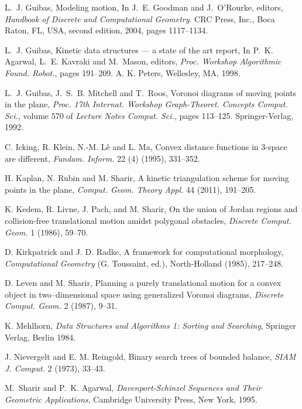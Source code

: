 \documentclass[letter,11pt]{article}
\begin{document}
\begin{thebibliography}{10}
L.~J. Guibas,
Modeling motion,
In J.~E. Goodman and J.~O'Rourke, editors, {\em Handbook of Discrete
and Computational Geometry}. CRC Press, Inc., Boca Raton, FL, USA, second
edition, 2004, pages 1117--1134.

L.~J. Guibas,
Kinetic data structures --- a state of the art report,
In P.~K. Agarwal, L.~E. Kavraki and M.~Mason, editors, {\em Proc.
Workshop Algorithmic Found. Robot.}, pages 191--209. A. K. Peters, Wellesley,
MA, 1998.

L.~J. Guibas, J.~S.~B. Mitchell and T.~Roos,
Voronoi diagrams of moving points in the plane,
{\em Proc. 17th Internat. Workshop Graph-Theoret. Concepts Comput.
Sci.}, volume 570 of {\em Lecture Notes Comput. Sci.}, pages 113--125.
Springer-Verlag, 1992.

C. Icking, R. Klein, N.-M. L\^{e} and L. Ma,
Convex distance functions in 3-space are different, {\it Fundam. Inform.} 22 (4) (1995), 331--352.

H. Kaplan, N. Rubin and M. Sharir, 
A kinetic triangulation scheme for moving points in the plane, {\it Comput. Geom. Theory Appl.} 44 (2011), 191--205.

K. Kedem, R. Livne, J. Pach, and M. Sharir, On the union of Jordan regions and collision-free translational motion amidst polygonal obstacles, {\em Discrete Comput. Geom.} 1 (1986), 59--70.

D. Kirkpatrick and J. D. Radke, A framework for computational morphology, \textit{Computational Geometry} (G. Toussaint, ed.), North-Holland (1985), 217--248.

D. Leven and M. Sharir,
Planning a purely translational motion for a convex object in
two--dimensional space using generalized Voronoi diagrams,
{\it Discrete Comput. Geom.} 2 (1987), 9--31.

K. Mehlhorn, \textit{Data Structures and Algorithms 1: Sorting and Searching}, Springer Verlag, Berlin 1984.

J. Nievergelt and E. M. Reingold, Binary search trees of bounded balance, {\it SIAM J. Comput.} 2 (1973),
33--43.

M.~Sharir and P.~K. Agarwal,
{\em Davenport-Schinzel Sequences and Their Geometric Applications},
Cambridge University Press, New York, 1995.

\end{thebibliography}
\end{document}
